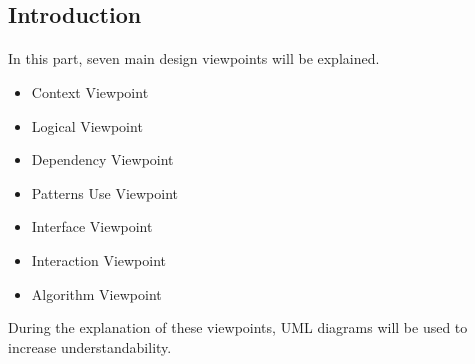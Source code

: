 
\subsection{Introduction}
\paragraph{}
\normalsize
In this part, seven main design viewpoints will be explained.\\

\begin{itemize}
 \item Context Viewpoint
 \item Logical Viewpoint
 \item Dependency Viewpoint
 \item Patterns Use Viewpoint 
 \item Interface Viewpoint
 \item Interaction Viewpoint
 \item Algorithm Viewpoint
\end{itemize}
 
During the explanation of these viewpoints, UML diagrams will be used to increase understandability. \\

\skipsubsection